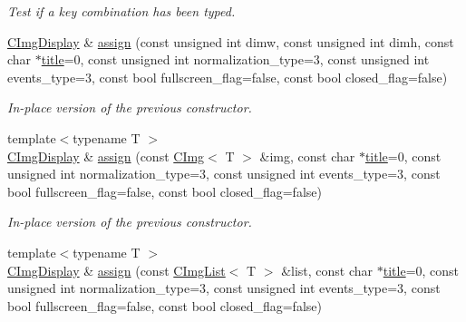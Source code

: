 \begin{DoxyCompactItemize}
\begin{DoxyCompactList}\small\item\em Test if a key combination has been typed. \item\end{DoxyCompactList}\item 
\hypertarget{structcimg__library_1_1_c_img_display_a3f8c36f69f66721ea534b4a99b78e3f9}{
\hyperlink{structcimg__library_1_1_c_img_display}{CImgDisplay} \& \hyperlink{structcimg__library_1_1_c_img_display_a3f8c36f69f66721ea534b4a99b78e3f9}{assign} (const unsigned int dimw, const unsigned int dimh, const char $\ast$\hyperlink{structcimg__library_1_1_c_img_display_afa41a285232ef89035e1832c7dc92ec1}{title}=0, const unsigned int normalization\_\-type=3, const unsigned int events\_\-type=3, const bool fullscreen\_\-flag=false, const bool closed\_\-flag=false)}
\label{structcimg__library_1_1_c_img_display_a3f8c36f69f66721ea534b4a99b78e3f9}

\begin{DoxyCompactList}\small\item\em In-\/place version of the previous constructor. \item\end{DoxyCompactList}\item 
\hypertarget{structcimg__library_1_1_c_img_display_addca36599cd11c3473b74a74cce459b6}{
{\footnotesize template$<$typename T $>$ }\\\hyperlink{structcimg__library_1_1_c_img_display}{CImgDisplay} \& \hyperlink{structcimg__library_1_1_c_img_display_addca36599cd11c3473b74a74cce459b6}{assign} (const \hyperlink{structcimg__library_1_1_c_img}{CImg}$<$ T $>$ \&img, const char $\ast$\hyperlink{structcimg__library_1_1_c_img_display_afa41a285232ef89035e1832c7dc92ec1}{title}=0, const unsigned int normalization\_\-type=3, const unsigned int events\_\-type=3, const bool fullscreen\_\-flag=false, const bool closed\_\-flag=false)}
\label{structcimg__library_1_1_c_img_display_addca36599cd11c3473b74a74cce459b6}

\begin{DoxyCompactList}\small\item\em In-\/place version of the previous constructor. \item\end{DoxyCompactList}\item 
\hypertarget{structcimg__library_1_1_c_img_display_a6718421a69ac9fd2fdca24c15b8dad63}{
{\footnotesize template$<$typename T $>$ }\\\hyperlink{structcimg__library_1_1_c_img_display}{CImgDisplay} \& \hyperlink{structcimg__library_1_1_c_img_display_a6718421a69ac9fd2fdca24c15b8dad63}{assign} (const \hyperlink{structcimg__library_1_1_c_img_list}{CImgList}$<$ T $>$ \&list, const char $\ast$\hyperlink{structcimg__library_1_1_c_img_display_afa41a285232ef89035e1832c7dc92ec1}{title}=0, const unsigned int normalization\_\-type=3, const unsigned int events\_\-type=3, const bool fullscreen\_\-flag=false, const bool closed\_\-flag=false)}
\label{structcimg__library_1_1_c_img_display_a6718421a69ac9fd2fdca24c15b8dad63}


\end{DoxyCompactItemize}

